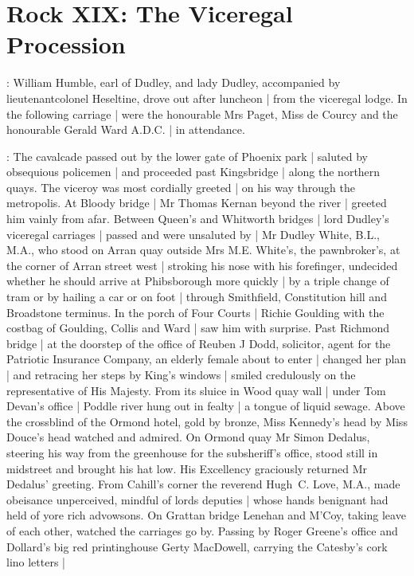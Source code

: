 \section*{Rock XIX: The Viceregal Procession}


:
William Humble,
earl of Dudley,
and lady Dudley,
accompanied by lieutenant\-colonel Heseltine,
drove out after luncheon |
from the viceregal lodge.
In the following carriage |
were the honourable Mrs Paget,
Miss de Courcy
and the honourable Gerald Ward A.D.C. |
in attendance.

:
The cavalcade passed out by the lower gate of Phoenix park |
saluted by obsequious policemen |
and proceeded past Kingsbridge |
along the northern quays.
The viceroy was most cordially greeted |
on his way through the metropolis.
At Bloody bridge |
Mr Thomas Kernan beyond the river |
greeted him vainly from afar.
Between Queen's and Whitworth bridges |
lord Dudley's viceregal carriages |
passed and were unsaluted by |
Mr Dudley White, B.L., M.A.,
who stood on Arran quay outside Mrs M.E. White's,
the pawnbroker's,
at the corner of Arran street west |
stroking his nose with his forefinger,
undecided whether he should arrive at Phibsborough more quickly |
by a triple change of tram
or by hailing a car
or on foot |
through Smithfield, Constitution hill and Broadstone terminus.
In the porch of Four Courts |
Richie Goulding
with the costbag of Goulding, Collis and Ward |
saw him with surprise.
Past Richmond bridge |
at the doorstep
of the office of Reuben J Dodd, solicitor,
agent for the Patriotic Insurance Company,
an elderly female about to enter |
changed her plan |
and retracing her steps by King's windows |
smiled credulously
on the representative of His Majesty.
From its sluice in Wood quay wall |
under Tom Devan's office |
Poddle river hung out in fealty |
a tongue of liquid sewage.
Above the crossblind of the Ormond hotel,
gold by bronze,
Miss Kennedy's head by Miss Douce's head
watched and admired.
On Ormond quay
Mr Simon Dedalus,
steering his way from the greenhouse for the subsheriff's office,
stood still in midstreet
and brought his hat low.
His Excellency graciously returned Mr Dedalus' greeting.
From Cahill's corner
the reverend Hugh~C. Love, M.A.,
made obeisance
unperceived,
mindful of lords deputies |
whose hands benignant
had held of yore rich advowsons.
On Grattan bridge
Lenehan and M'Coy,
taking leave of each other,
watched the carriages go by.
Passing by Roger Greene's office
and Dollard's big red printinghouse
Gerty MacDowell,
carrying the Catesby's cork lino letters |
